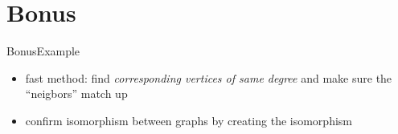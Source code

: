 
\section{Bonus}

\begin{frame}[allowframebreaks]{Bonus}{Example}
  \begin{example}
    \begin{itemize}
      \item \alert{fast method:} find \textit{corresponding vertices of same degree} and make sure the \enquote{neigbors} match up
      \item \alert{confirm isomorphism} between graphs by \alert{creating the isomorphism}
    \end{itemize}
  \end{example}
\end{frame}

